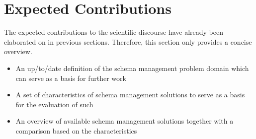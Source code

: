 
\section{Expected Contributions}\label{sec:expected-results}

The expected contributions to the scientific discourse have already been elaborated on in previous sections.
Therefore, this section only provides a concise overview.

\begin{itemize}
  \item An up\-/to\-/date definition of the schema management problem domain which can serve as a basis for further work
  \item A set of characteristics of schema management solutions to serve as a basis for the evaluation of such
  \item An overview of available schema management solutions together with a comparison based on the characteristics
\end{itemize}
